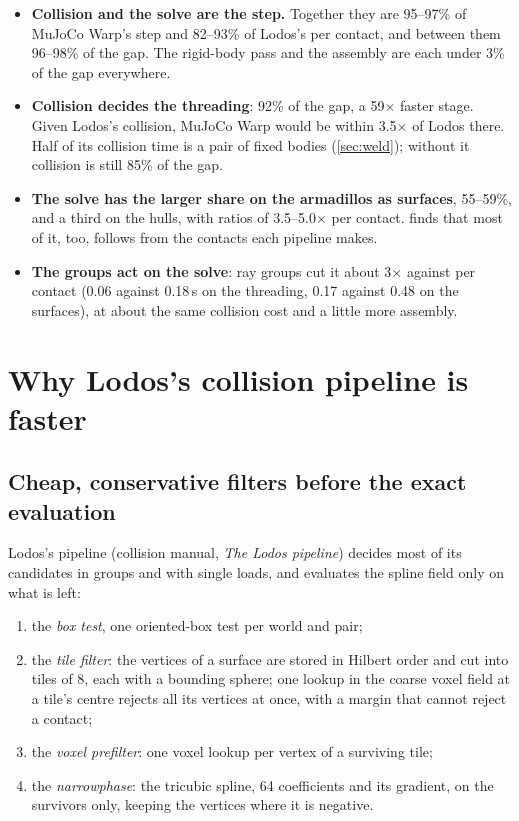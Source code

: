 \begin{itemize}
\item \textbf{Collision and the solve are the step.} Together they are 95--97\% of MuJoCo Warp's step and 82--93\% of Lodos's per contact, and between them 96--98\% of the gap. The rigid-body pass and the assembly are each under 3\% of the gap everywhere.
\item \textbf{Collision decides the threading}: 92\% of the gap, a 59$\times$ faster stage. Given Lodos's collision, MuJoCo Warp would be within 3.5$\times$ of Lodos there. Half of its collision time is a pair of fixed bodies (\cref{sec:weld}); without it collision is still 85\% of the gap.
\item \textbf{The solve has the larger share on the armadillos as surfaces}, 55--59\%, and a third on the hulls, with ratios of 3.5--5.0$\times$ per contact.  finds that most of it, too, follows from the contacts each pipeline makes.
\item \textbf{The groups act on the solve}: ray groups cut it about 3$\times$ against per contact (0.06 against 0.18\,\micro s on the threading, 0.17 against 0.48 on the surfaces), at about the same collision cost and a little more assembly.
\end{itemize}

\section{Why Lodos's collision pipeline is faster}\label{sec:why}

\subsection{Cheap, conservative filters before the exact evaluation}\label{sec:funnel}

Lodos's pipeline (collision manual, \emph{The Lodos pipeline}) decides most of its candidates in groups and with single loads, and evaluates the spline field only on what is left:

\begin{enumerate}
\item the \emph{box test}, one oriented-box test per world and pair;
\item the \emph{tile filter}: the vertices of a surface are stored in Hilbert order and cut into tiles of 8, each with a bounding sphere; one lookup in the coarse voxel field at a tile's centre rejects all its vertices at once, with a margin that cannot reject a contact;
\item the \emph{voxel prefilter}: one voxel lookup per vertex of a surviving tile;
\item the \emph{narrowphase}: the tricubic spline, 64 coefficients and its gradient, on the survivors only, keeping the vertices where it is negative.
\end{enumerate}


